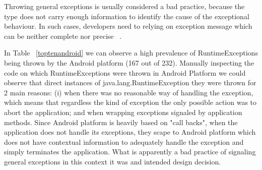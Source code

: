 \documentclass[conference]{IEEEtran}
\begin{document}
Throwing general exceptions is usually considered a
bad practice, because the type does not carry enough information to identify the
cause of the exceptional behaviour. In such cases, developers need to relying on
exception message which can be neither complete nor precise
~\cite{gosling2000java}.

In Table ~\ref{toptenandroid} we can observe a high prevalence of
RuntimeExceptions being thrown by the Android platform (167 out of 232).
Manually inspecting the code on which RuntimeExceptions were thrown in Android
Platform we could observe that direct instances of java.lang.RuntimeException
they were thrown for 2 main reasons: (i) when there was no reasonable way of
handling the exception, which means that regardless the kind of exception the
only possible action was to abort the application; and when wrapping exceptions
signaled by application methods. Since Android platform is heavily based on
"call backs", when the application does not handle its exceptions, they scape to
Android platform which does not have contextual information to adequately handle
the exception and simply terminates the application. What is apparently a bad
practice of signaling general exceptions in this context it was and intended
design decision.







\end{document}
